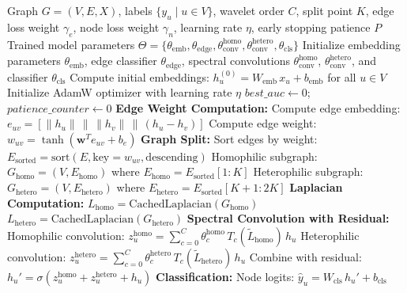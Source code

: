 \begin{algorithm}[H]
\caption{SplitGNN Training Procedure}
\label{alg:splitgnn}
\begin{algorithmic}[1]
\REQUIRE Graph $G = (V, E, X)$, labels $\{y_u \mid u \in V\}$, wavelet order $C$, split point $K$, edge loss weight $\gamma_e$, node loss weight $\gamma_n$, learning rate $\eta$, early stopping patience $P$
\ENSURE Trained model parameters $\Theta = \{\theta_{\text{emb}}, \theta_{\text{edge}}, \theta_{\text{conv}}^{\text{homo}}, \theta_{\text{conv}}^{\text{hetero}}, \theta_{\text{cls}}\}$
\STATE Initialize embedding parameters $\theta_{\text{emb}}$, edge classifier $\theta_{\text{edge}}$, spectral convolutions $\theta_{\text{conv}}^{\text{homo}}$, $\theta_{\text{conv}}^{\text{hetero}}$, and classifier $\theta_{\text{cls}}$
\STATE Compute initial embeddings: $h_u^{(0)} = W_{\text{emb}} \, x_u + b_{\text{emb}}$ for all $u \in V$
\STATE Initialize AdamW optimizer with learning rate $\eta$
\STATE $best\_auc \leftarrow 0$; $patience\_counter \leftarrow 0$
    \STATE \textbf{Edge Weight Computation:}
        \STATE Compute edge embedding: $e_{uv} = \left[\|h_u\| \, \| \, \|h_v\| \, \| \, (h_u - h_v)\right]$
        \STATE Compute edge weight: $w_{uv} = \tanh\!\left(\mathbf{w}^T e_{uv} + b_e\right)$
    \ENDFOR
    \STATE \textbf{Graph Split:}
    \STATE Sort edges by weight: $E_{\text{sorted}} = \text{sort}(E, \text{key}=w_{uv}, \text{descending})$
    \STATE Homophilic subgraph: $G_{\text{homo}} = (V, E_{\text{homo}})$ where $E_{\text{homo}} = E_{\text{sorted}}[1:K]$
    \STATE Heterophilic subgraph: $G_{\text{hetero}} = (V, E_{\text{hetero}})$ where $E_{\text{hetero}} = E_{\text{sorted}}[K+1:2K]$
    \STATE \textbf{Laplacian Computation:}
    \STATE $L_{\text{homo}} = \text{CachedLaplacian}(G_{\text{homo}})$
    \STATE $L_{\text{hetero}} = \text{CachedLaplacian}(G_{\text{hetero}})$
    \STATE \textbf{Spectral Convolution with Residual:}
        \STATE Homophilic convolution: $z_u^{\text{homo}} = \sum_{c=0}^{C} \theta_c^{\text{homo}} \, T_c(\tilde{L}_{\text{homo}}) \, h_u$
        \STATE Heterophilic convolution: $z_u^{\text{hetero}} = \sum_{c=0}^{C} \theta_c^{\text{hetero}} \, T_c(\tilde{L}_{\text{hetero}}) \, h_u$
        \STATE Combine with residual: $h_u' = \sigma\!\left(z_u^{\text{homo}} + z_u^{\text{hetero}} + h_u\right)$
    \ENDFOR
    \STATE \textbf{Classification:}
        \STATE Node logits: $\hat{y}_u = W_{\text{cls}} \, h_u' + b_{\text{cls}}$

\end{algorithmic}
\end{algorithm}
